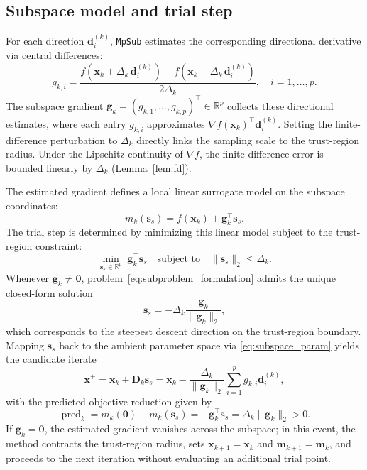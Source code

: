 \documentclass[smallextended]{svjour3}
\newcommand{\bx}{\bm{x}}
\newcommand{\bd}{\bm{d}}
\newcommand{\bg}{\bm{g}}
\newcommand{\bs}{\bm{s}}
\begin{document}
\subsection{Subspace model and trial step}
\label{subsec:gradient}
\label{subsec:trial}

For each direction $\bd_i^{(k)}$, \texttt{MpSub} estimates the corresponding directional derivative via central differences:
\begin{equation}
g_{k,i} = \frac{f(\bx_k + \Delta_k \, \bd_i^{(k)}) - f(\bx_k - \Delta_k \, \bd_i^{(k)})}{2\Delta_k}, \quad i = 1, \ldots, p.
\label{eq:central_diff}
\end{equation}
The subspace gradient $\bg_k = (g_{k,1}, \ldots, g_{k,p})^\top \in \mathbb{R}^p$ collects these directional estimates, where each entry $g_{k,i}$ approximates $\nabla f(\bx_k)^\top \bd_i^{(k)}$. Setting the finite-difference perturbation to $\Delta_k$ directly links the sampling scale to the trust-region radius. Under the Lipschitz continuity of $\nabla f$, the finite-difference error is bounded linearly by $\Delta_k$ (Lemma~\ref{lem:fd}).

The estimated gradient defines a local linear surrogate model on the subspace coordinates:
\begin{equation}
m_k(\bs_s) = f(\bx_k) + \bg_k^\top \bs_s.
\label{eq:linear_model}
\end{equation}
The trial step is determined by minimizing this linear model subject to the trust-region constraint:
\begin{equation}
\min_{\bs_s \in \mathbb{R}^p}\; \bg_k^\top \bs_s \quad \text{subject to} \quad \|\bs_s\|_2 \leq \Delta_k.
\label{eq:subproblem_formulation}
\end{equation}
Whenever $\bg_k \ne \bm 0$, problem~\eqref{eq:subproblem_formulation} admits the unique closed-form solution
\begin{equation}
\bs_s = -\Delta_k \frac{\bg_k}{\|\bg_k\|_2},
\label{eq:closed_form_step}
\end{equation}
which corresponds to the steepest descent direction on the trust-region boundary. Mapping $\bs_s$ back to the ambient parameter space via \eqref{eq:subspace_param} yields the candidate iterate
\begin{equation}
\bx^+ = \bx_k + \bm D_k \bs_s = \bx_k - \frac{\Delta_k}{\|\bg_k\|_2} \sum_{i=1}^p g_{k,i} \bd_i^{(k)},
\label{eq:full_trial_point}
\end{equation}
with the predicted objective reduction given by
\begin{equation}
\operatorname{pred}_k = m_k(\bm 0) - m_k(\bs_s) = -\bg_k^\top \bs_s = \Delta_k \|\bg_k\|_2 > 0.
\label{eq:pred_reduction}
\end{equation}
If $\bg_k = \bm 0$, the estimated gradient vanishes across the subspace; in this event, the method contracts the trust-region radius, sets $\bx_{k+1} = \bx_k$ and $\bm m_{k+1} = \bm m_k$, and proceeds to the next iteration without evaluating an additional trial point.
\end{document}
